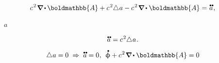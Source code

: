 \begin{gather*}
c^{\hspace{.16ex}2} \hspace{.22ex} \boldnabla \hspace{-0.12ex} \dotp \hspace{-0.12ex} \boldmathbb{A} + c^{\hspace{.16ex}2} \hspace{-0.4ex} \Laplacian \hspace{.07ex} a
- c^{\hspace{.16ex}2} \hspace{.22ex} \boldnabla \hspace{-0.1ex} \dotp \boldmathbb{A} = \hspace{.15ex} \mathdotdotabove{a}
\hspace{.16ex} ,
\end{gather*}

\vspace{-0.16em} \noindent {}  \href{https://en.wikipedia.org/wiki/Wave_equation}{} ~$a$

\nopagebreak\vspace{-0.12em}\begin{equation}\label{gaugeadditioniswave}
\mathdotdotabove{a} \hspace{.1ex} = c^{\hspace{.16ex}2} \hspace{-0.4ex} \Laplacian \hspace{.07ex} a
\hspace{.16ex} .
\end{equation}

\vspace{-0.15em} \noindent {} \ru{\:---}  

\nopagebreak\vspace{-0.12em}\begin{equation*}
\Laplacian \hspace{.07ex} a = 0
\hspace{.3em} \Rightarrow \hspace{.3em}
\mathdotdotabove{a} = 0
\hspace{.1ex} , \:\:
\mathdotabove{\upphi} + c^{\hspace{.16ex}2} \hspace{.22ex} \boldnabla \hspace{-0.1ex} \dotp \boldmathbb{A} = 0
\end{equation*}

